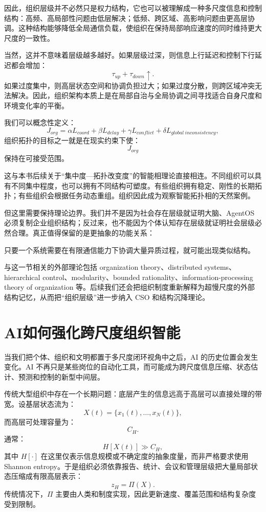因此，组织层级并不必然只是权力结构，它也可以被理解成一种多尺度信息和控制结构：高频、高局部性问题由低层解决；低频、跨区域、高影响问题由更高层协调。这种结构能够降低全局通信负载，使组织在保持局部响应速度的同时维持更大尺度的一致性。

当然，这并不意味着层级越多越好。如果层级过深，则信息上行延迟和控制下行延迟都会增加：
\[
\tau_{up}+\tau_{down}
\uparrow.
\]
如果过度集中，则高层状态空间和协调负担过大；如果过度分散，则跨区域冲突无法解决。因此，组织架构本质上是在局部自治与全局协调之间寻找适合自身尺度和环境变化率的平衡。

我们可以概念性定义：
\[
J_{org}
=
\alpha L_{coord}
+
\beta L_{delay}
+
\gamma L_{conflict}
+
\delta L_{global\;inconsistency},
\]
组织拓扑的目标之一就是在现实约束下使：
\[
J_{org}
\]
保持在可接受范围。

这与本书后续关于“集中度—拓扑改变度”的智能相理论直接相连。不同组织可以具有不同集中程度，也可以拥有不同结构可塑度。有些组织拥有稳定、刚性的长期拓扑；有些组织会根据任务动态重组。组织因此成为观察智能拓扑相的天然案例。

但这里需要保持理论边界。我们并不是因为社会存在层级就证明大脑、AgentOS 必须复制企业组织结构；反过来，也不能因为个体认知存在层级就证明社会层级必然合理。真正值得保留的是更抽象的功能关系：
\begin{statementbox}
\centering
{}
\end{statementbox}
只要一个系统需要在有限通信能力下协调大量异质过程，就可能出现类似结构。

与这一节相关的外部理论包括 organization theory、distributed systems、hierarchical control、modularity、bounded rationality、information-processing theory of organization 等。后续我们还会把组织制度重新解释为超慢尺度的外部结构记忆，从而把“组织层级”进一步纳入 CSO 和结构沉降理论。

\section{AI如何强化跨尺度组织智能}

当我们把个体、组织和文明都置于多尺度闭环视角中之后，AI 的历史位置会发生变化。AI 不再只是某些岗位的自动化工具，而可能成为跨尺度信息压缩、状态估计、预测和控制的新型中间层。

传统大型组织中存在一个长期问题：底层产生的信息远高于高层可以直接处理的带宽。设基层状态流为：
\[
X(t)
=
\{x_1(t),\ldots,x_N(t)\},
\]
而高层可处理容量为：
\[
C_H.
\]
通常：
\[
H[X(t)]
\gg
C_H,
\]
其中 $H[\cdot]$ 在这里仅表示信息规模或不确定度的抽象度量，而非严格要求使用 Shannon entropy。于是组织必须依靠报告、统计、会议和管理层级把大量局部状态压缩成有限高层表示：
\[
z_H
=
\Pi(X).
\]
传统情况下，$\Pi$ 主要由人类和制度实现，因此更新速度、覆盖范围和结构复杂度受到限制。

